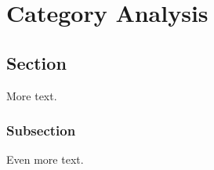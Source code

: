 \chapter{Category Analysis\label{cha:catanalysis}}


\section{Section}

More text.

\subsection{Subsection}

Even more text.